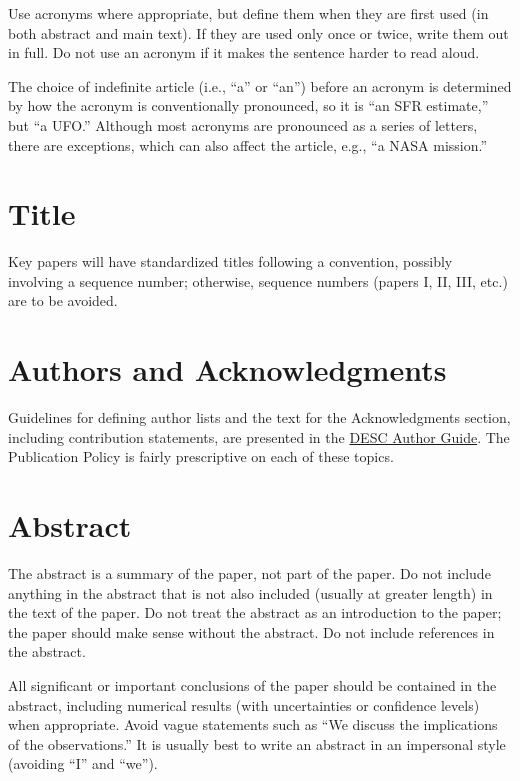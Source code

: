 \documentclass[letterpaper,11pt]{article}
\begin{document}
Use acronyms where appropriate, but define them when they are first used
(in both
abstract and main text).  If they are used only once or twice, write them out
in full.  Do not use an acronym if it makes the sentence harder to read aloud.

The choice of indefinite article (i.e., ``a'' or ``an'') before an
acronym is determined by how the acronym is conventionally pronounced,
so it is ``an SFR estimate,'' but ``a UFO.''  Although most acronyms are
pronounced as a series of letters, there are exceptions, which can also affect
the article, e.g., ``a NASA mission.''

\section{Title}

Key papers will have standardized titles following a  convention, possibly involving a sequence number; otherwise, sequence numbers (papers I, II, III, etc.) are to be avoided.

\section{Authors and Acknowledgments}

Guidelines for defining author lists and the text for the Acknowledgments section, including contribution statements, are presented in the \href{https://github.com/LSSTDESC/Author_Guide/blob/compiled/main.pdf}{DESC Author Guide}.  The Publication Policy is fairly prescriptive on each of these topics.

\section{Abstract}

The abstract is a summary of the paper, not part of the paper.  Do not include
anything in the abstract that is not also included (usually at greater length)
in the text of the paper. Do not treat the abstract as an introduction to the
paper; the paper should make sense without the abstract.  Do not include
references in the abstract.

All significant or important conclusions of the paper should be contained
in the abstract, including numerical results (with uncertainties or confidence
levels) when appropriate.  Avoid vague statements such as ``We discuss the
implications of the observations.''  It is usually best to write an abstract
in an impersonal style (avoiding ``I'' and ``we'').
\end{document}
